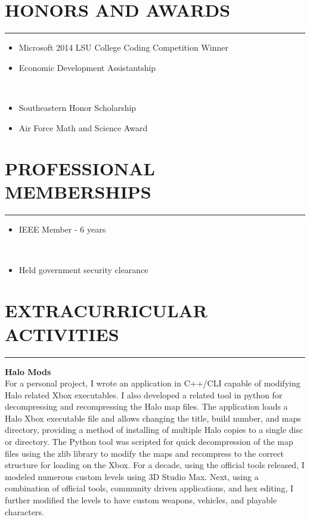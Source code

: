 \documentclass{res}
\begin{document}
\begin{resume}
\section{HONORS AND AWARDS}
	\vspace{0.005in}	
	\rule{\textwidth}{0.5pt}
		\begin{multicols}{2}
			{
				\begin{itemize}
					\item Microsoft 2014 LSU College Coding Competition Winner
					\item Economic Development Assistantship
				\end{itemize} 
				\ %
				\vspace{-0.175in}
				\begin{itemize}
					\item Southeastern Honor Scholarship
					\item Air Force Math and Science Award
				\end{itemize}
			}
		\end{multicols}	

\section{PROFESSIONAL MEMBERSHIPS}
	\vspace{0.005in}	
	\rule{\textwidth}{0.5pt}
		\begin{multicols}{2}
			{
				\begin{itemize}
					\item IEEE Member - 6 years
				\end{itemize} 
				\ %
				\vspace{-0.175in}
				\begin{itemize}
					\item Held government security clearance
				\end{itemize}
			}
		\end{multicols}


\section{EXTRACURRICULAR ACTIVITIES}
	\vspace{0.005in}	
	\rule{\textwidth}{0.5pt}
	{\bf Halo Mods}\\
	For a personal project, I wrote an application in C++/CLI capable of modifying Halo related Xbox executables. I also developed a related tool in python for decompressing and recompressing the Halo map files. The application loads a Halo Xbox executable file and allows changing the title, build number, and maps directory, providing a method of installing of multiple Halo copies to a single disc or directory. The Python tool was scripted for quick decompression of the map files using the zlib library to modify the maps and recompress to the correct structure for loading on the Xbox. For a decade, using the official tools released, I modeled numerous custom levels using 3D Studio Max. Next, using a combination of official tools, community driven applications, and hex editing, I further modified the levels to have custom weapons, vehicles, and playable characters.
		

\end{resume}
\end{document}
